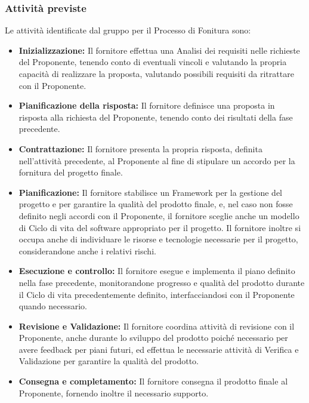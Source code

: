 \documentclass[a4paper,12pt]{article}
\begin{document}
\subsubsection{Attività previste}
Le attività identificate dal gruppo per il Processo di Fonitura sono:
\begin{itemize}
    \item \textbf{Inizializzazione:}
    Il fornitore effettua una Analisi dei requisiti nelle richieste del Proponente, tenendo conto di eventuali vincoli e valutando la propria capacità di realizzare la proposta, valutando possibili requisiti da ritrattare con il Proponente.

    \item \textbf{Pianificazione della risposta:}
    Il fornitore definisce una proposta in risposta alla richiesta del Proponente, tenendo conto dei risultati della fase precedente.
    
    \item \textbf{Contrattazione:}
    Il fornitore presenta la propria risposta, definita nell’attività precedente, al Proponente al fine di stipulare un accordo per la fornitura del progetto finale.

    \item \textbf{Pianificazione:}
    Il fornitore stabilisce un Framework per la gestione del progetto e per garantire la qualità del prodotto finale, e, nel caso non fosse definito negli accordi con il Proponente, il fornitore sceglie anche un modello di Ciclo di vita del software appropriato per il progetto. Il fornitore inoltre si occupa anche di individuare le risorse e tecnologie necessarie per il progetto, considerandone anche i relativi rischi.

    \item \textbf{Esecuzione e controllo:}
    Il fornitore esegue e implementa il piano definito nella fase precedente, monitorandone progresso e qualità del prodotto durante il Ciclo di vita precedentemente definito, interfacciandosi con il Proponente quando necessario.

    \item \textbf{Revisione e Validazione:}
    Il fornitore coordina attività di revisione con il Proponente, anche durante lo sviluppo del prodotto poiché necessario per avere feedback per piani futuri, ed effettua le necessarie attività di Verifica e Validazione per garantire la qualità del prodotto.

    \item \textbf{Consegna e completamento:}
    Il fornitore consegna il prodotto finale al Proponente, fornendo inoltre il necessario supporto.

\end{itemize}
\end{document}
